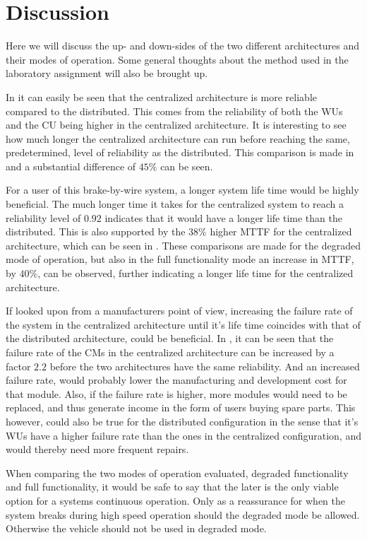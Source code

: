 \newpage
\section{Discussion}
\label{S5}
Here we will discuss the up- and down-sides of the two different architectures and their modes of operation. Some general thoughts about the method used in the laboratory assignment will also be brought up.

In  it can easily be seen that the centralized architecture is more reliable compared to the distributed. This comes from the reliability of both the WUs and the CU being higher in the centralized architecture. It is interesting to see how much longer the centralized architecture can run before reaching the same, predetermined, level of reliability as the distributed. This comparison is made in  and a substantial difference of $45\%$ can be seen. 

For a user of this brake-by-wire system, a longer system life time would be highly beneficial. The much longer time it takes for the centralized system to reach a reliability level of $0.92$ indicates that it would have a longer life time than the distributed. This is also supported by the $38\%$ higher MTTF for the centralized architecture, which can be seen in . These comparisons are made for the degraded mode of operation, but also in the full functionality mode an increase in MTTF, by $40\%$, can be observed, further indicating a longer life time for the centralized architecture.   

If looked upon from a manufacturers point of view, increasing the failure rate of the system in the centralized architecture until it's life time coincides with that of the distributed architecture, could be beneficial. In , it can be seen that the failure rate of the CMs in the centralized architecture can be increased by a factor $2.2$ before the two architectures have the same reliability. And an increased failure rate, would probably lower the manufacturing and development cost for that module. Also, if the failure rate is higher, more modules would need to be replaced, and thus generate income in the form of users buying spare parts. This however, could also be true for the distributed configuration in the sense that it's WUs have a higher failure rate than the ones in the centralized configuration, and would thereby need more frequent repairs. 

When comparing the two modes of operation evaluated, degraded functionality and full functionality, it would be safe to say that the later is the only viable option for a systems continuous operation. Only as a reassurance for when the system breaks during high speed operation should the degraded mode be allowed. Otherwise the vehicle should not be used in degraded mode.

